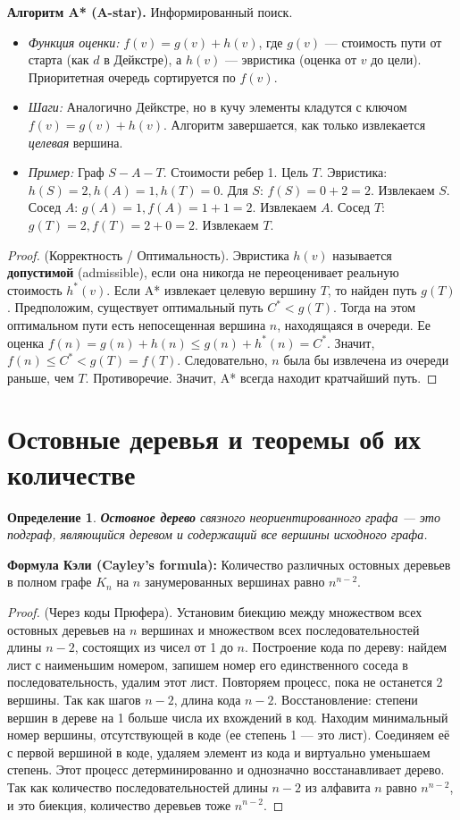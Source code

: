 \documentclass[12pt, a4paper]{article}
\newtheorem{definition}{Определение}
\begin{document}
\textbf{Алгоритм A* (A-star).} Информированный поиск.
\begin{itemize}
    \item \textit{Функция оценки:} $f(v) = g(v) + h(v)$, где $g(v)$ --- стоимость пути от старта (как $d$ в Дейкстре), а $h(v)$ --- эвристика (оценка от $v$ до цели). Приоритетная очередь сортируется по $f(v)$.
    \item \textit{Шаги:} Аналогично Дейкстре, но в кучу элементы кладутся с ключом $f(v) = g(v) + h(v)$. Алгоритм завершается, как только извлекается \textit{целевая} вершина.
    \item \textit{Пример:} Граф $S-A-T$. Стоимости ребер 1. Цель $T$. Эвристика: $h(S)=2, h(A)=1, h(T)=0$. Для $S$: $f(S) = 0+2=2$. Извлекаем $S$. Сосед $A$: $g(A)=1, f(A)=1+1=2$. Извлекаем $A$. Сосед $T$: $g(T)=2, f(T)=2+0=2$. Извлекаем $T$.
\end{itemize}
\begin{proof}
(Корректность / Оптимальность). Эвристика $h(v)$ называется \textbf{допустимой} (admissible), если она никогда не переоценивает реальную стоимость $h^*(v)$. Если A* извлекает целевую вершину $T$, то найден путь $g(T)$. Предположим, существует оптимальный путь $C^* < g(T)$. Тогда на этом оптимальном пути есть непосещенная вершина $n$, находящаяся в очереди. Ее оценка $f(n) = g(n) + h(n) \le g(n) + h^*(n) = C^*$. Значит, $f(n) \le C^* < g(T) = f(T)$. Следовательно, $n$ была бы извлечена из очереди раньше, чем $T$. Противоречие. Значит, A* всегда находит кратчайший путь.
\end{proof}

\section{Остовные деревья и теоремы об их количестве}

\begin{definition}
\textbf{Остовное дерево} связного неориентированного графа --- это подграф, являющийся деревом и содержащий все вершины исходного графа.
\end{definition}

\textbf{Формула Кэли (Cayley's formula):} Количество различных остовных деревьев в полном графе $K_n$ на $n$ занумерованных вершинах равно $n^{n-2}$.
\begin{proof}
(Через коды Прюфера). Установим биекцию между множеством всех остовных деревьев на $n$ вершинах и множеством всех последовательностей длины $n-2$, состоящих из чисел от 1 до $n$.
Построение кода по дереву: найдем лист с наименьшим номером, запишем номер его единственного соседа в последовательность, удалим этот лист. Повторяем процесс, пока не останется 2 вершины. Так как шагов $n-2$, длина кода $n-2$.
Восстановление: степени вершин в дереве на 1 больше числа их вхождений в код. Находим минимальный номер вершины, отсутствующей в коде (ее степень 1 --- это лист). Соединяем её с первой вершиной в коде, удаляем элемент из кода и виртуально уменьшаем степень. Этот процесс детерминированно и однозначно восстанавливает дерево. Так как количество последовательностей длины $n-2$ из алфавита $n$ равно $n^{n-2}$, и это биекция, количество деревьев тоже $n^{n-2}$.
\end{proof}
\end{document}
